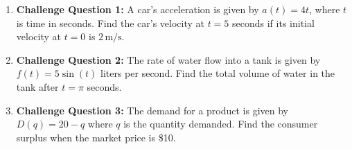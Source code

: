 \begin{enumerate}
    \item \textbf{Challenge Question 1:} A car’s acceleration is given by \( a(t) = 4t \), where \( t \) is time in seconds. Find the car’s velocity at \( t = 5 \) seconds if its initial velocity at \( t = 0 \) is \( 2 \, \text{m/s} \).
    
    \begin{center}
    \end{center}

    \item \textbf{Challenge Question 2:} The rate of water flow into a tank is given by \( f(t) = 5 \sin(t) \) liters per second. Find the total volume of water in the tank after \( t = \pi \) seconds.
    
    \begin{center}
    \end{center}

    \item \textbf{Challenge Question 3:} The demand for a product is given by \( D(q) = 20 - q \) where \( q \) is the quantity demanded. Find the consumer surplus when the market price is \$10.
    

\end{enumerate}
